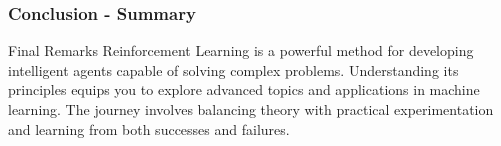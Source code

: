 \documentclass[aspectratio=169]{beamer}
\begin{document}
\begin{frame}[fragile]
    \frametitle{Conclusion - Summary}
    \begin{block}{Final Remarks}
        Reinforcement Learning is a powerful method for developing intelligent agents capable of solving complex problems. Understanding its principles equips you to explore advanced topics and applications in machine learning. The journey involves balancing theory with practical experimentation and learning from both successes and failures.
    \end{block}
\end{frame}
\end{document}
